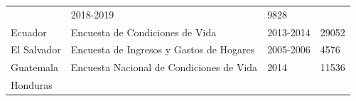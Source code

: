 \documentclass[12pt,spanish,]{book}
\begin{document}
\begin{longtable}[]{@{}llll@{}}
\begin{minipage}[t]{0.50\columnwidth}
\end{minipage} & \begin{minipage}[t]{0.08\columnwidth}\raggedright
2018-2019\strut
\end{minipage} & \begin{minipage}[t]{0.14\columnwidth}\raggedright
9828\strut
\end{minipage}\tabularnewline
\begin{minipage}[t]{0.17\columnwidth}\raggedright
Ecuador\strut
\end{minipage} & \begin{minipage}[t]{0.50\columnwidth}\raggedright
Encuesta de Condiciones de Vida\strut
\end{minipage} & \begin{minipage}[t]{0.08\columnwidth}\raggedright
2013-2014\strut
\end{minipage} & \begin{minipage}[t]{0.14\columnwidth}\raggedright
29052\strut
\end{minipage}\tabularnewline
\begin{minipage}[t]{0.17\columnwidth}\raggedright
El Salvador\strut
\end{minipage} & \begin{minipage}[t]{0.50\columnwidth}\raggedright
Encuesta de Ingresos y Gastos de Hogares\strut
\end{minipage} & \begin{minipage}[t]{0.08\columnwidth}\raggedright
2005-2006\strut
\end{minipage} & \begin{minipage}[t]{0.14\columnwidth}\raggedright
4576\strut
\end{minipage}\tabularnewline
\begin{minipage}[t]{0.17\columnwidth}\raggedright
Guatemala\strut
\end{minipage} & \begin{minipage}[t]{0.50\columnwidth}\raggedright
Encuesta Nacional de Condiciones de Vida\strut
\end{minipage} & \begin{minipage}[t]{0.08\columnwidth}\raggedright
2014\strut
\end{minipage} & \begin{minipage}[t]{0.14\columnwidth}\raggedright
11536\strut
\end{minipage}\tabularnewline
\begin{minipage}[t]{0.17\columnwidth}\raggedright
Honduras\strut
\end{minipage} & \begin{minipage}[t]{0.50\columnwidth}\raggedright

\end{minipage}
\end{longtable}
\end{document}
